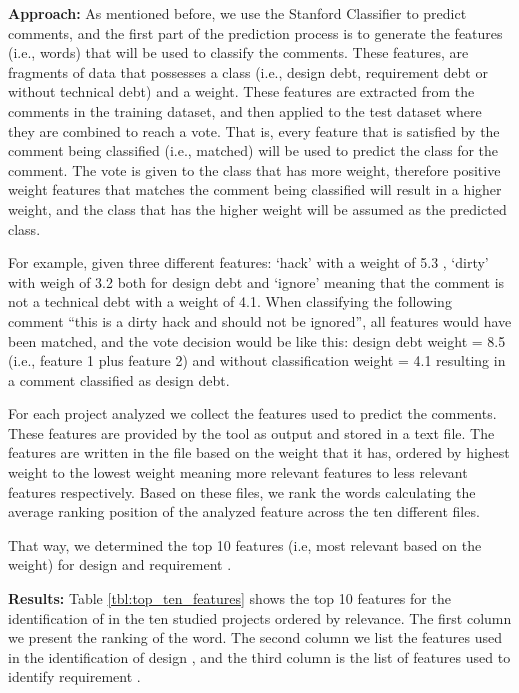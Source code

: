 \vspace{1mm}
\noindent \textbf{Approach:} As mentioned before, we use the Stanford Classifier to predict \SATD comments, and the first part of the prediction process is to generate the features (i.e., words) that will be used to classify the comments. These features, are fragments of data that possesses a class (i.e., design debt, requirement debt or without technical debt) and a weight. These features are extracted from the comments in the training dataset, and then applied to the test dataset where they are combined to reach a vote. That is, every feature that is satisfied by the comment being classified (i.e., matched) will be used to predict the class for the comment. The vote is given to the class that has more weight, therefore positive weight features that matches the comment being classified will result in a higher weight, and the class that has the higher weight will be assumed as the predicted class.


For example, given three different features: `hack' with a weight of 5.3 , `dirty' with weigh of 3.2 both for design debt and `ignore' meaning that the comment is not a technical debt with a weight of 4.1. When classifying the following comment ``this is a dirty hack and should not be ignored'', all features would have been matched, and the vote decision would be like this: design debt weight = 8.5 (i.e., feature 1 plus feature 2) and without classification weight = 4.1 resulting in a comment classified as  design debt.

For each project analyzed we collect the features used to predict the \SATD comments. These features are provided by the tool as output and stored in a text file. The features are written in the file based on the weight that it has, ordered by highest weight to the lowest weight meaning more relevant features to less relevant features respectively. Based on these files, we rank the words calculating the average ranking position of the analyzed feature across the ten different files. 

That way, we determined the top 10 features (i.e, most relevant based on the weight) for design \SATD and requirement \SATD.

\vspace{1mm}
\noindent \textbf{Results:} Table \ref{tbl:top_ten_features} shows the top 10 features for the identification of \SATD in the ten studied projects ordered by relevance. The first column we  present the ranking of the word. The second column we list the features used in the identification of design \SATD, and the third column is the list of features used to identify requirement \SATD.

